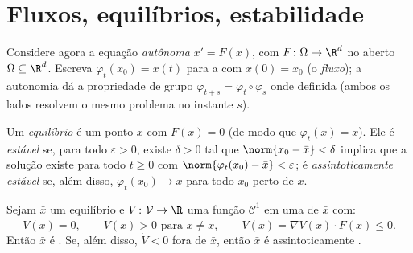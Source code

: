 \section{Fluxos, equilíbrios, estabilidade}

Considere agora a equação \emph{autônoma} $x' = F(x)$, com $F
\colon \Omega \to \R^d$  no aberto $\Omega
\subseteq \R^d$. Escreva $\varphi_t(x_0) = x(t)$ para a  com
$x(0) = x_0$ (o \emph{fluxo}); a autonomia
dá a propriedade de grupo $\varphi_{t+s} =
\varphi_t\circ\varphi_s$ onde definida (ambos os lados resolvem o
mesmo problema no instante $s$).

\begin{definition}\label{def:b3:ode:stability}
Um \emph{equilíbrio} é um ponto $\bar x$ com $F(\bar x) =
0$ (de modo que
$\varphi_t(\bar x) = \bar x$). Ele é \emph{estável} se, para
todo $\varepsilon > 0$, existe $\delta > 0$ tal que $\norm{x_0 - \bar x} < \delta$ implica que a solução existe para
todo $t \geq 0$ com $\norm{\varphi_t(x_0) - \bar
x} < \varepsilon$; é \emph{assintoticamente estável} se, além disso,
$\varphi_t(x_0) \to \bar x$ para todo $x_0$ perto de $\bar x$.
\end{definition}

\begin{theorem}\label{thm:b3:ode:lyapunov}
Sejam $\bar x$ um equilíbrio e $V \colon \mathcal V \to
\R$ uma função $\mathcal C^1$ em uma
 de $\bar x$ com:
\[
V(\bar x) = 0,\qquad V(x) > 0 \text{ para } x \neq \bar x,
\qquad \dot V(x) = \nabla V(x)\cdot F(x) \leq 0 .
\]
Então $\bar x$ é . Se, além disso, $\dot V < 0 $ fora de $\bar
x$,
então $\bar x$ é assintoticamente .
\end{theorem}

